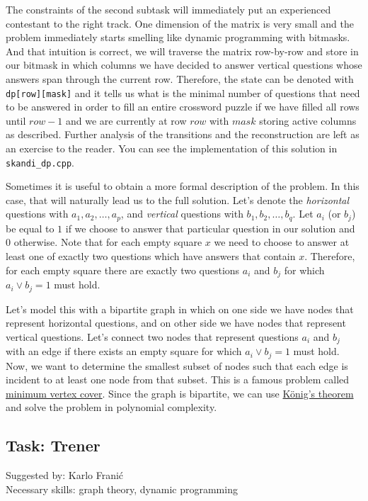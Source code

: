 \documentclass[a4paper]{article}
\begin{document}
The constraints of the second subtask will immediately put an experienced
contestant to the right track. One dimension of the matrix is very small and
the problem immediately starts smelling like dynamic programming with bitmasks.
And that intuition is correct, we will traverse the matrix row-by-row and store
in our bitmask in which columns we have decided to answer vertical questions
whose answers span through the current row. Therefore, the state can be denoted
with \texttt{dp[row][mask]} and it tells us what is the minimal number of
questions that need to be answered in order to fill an entire crossword puzzle
if we have filled all rows until $row-1$ and we are currently at row $row$ with
$mask$ storing active columns as described. Further analysis of the transitions
and the reconstruction are left as an exercise to the reader. You can see the
implementation of this solution in \texttt{skandi\_dp.cpp}.

Sometimes it is useful to obtain a more formal description of the problem.  In
this case, that will naturally lead us to the full solution. Let's denote the
\textit{horizontal} questions with $a_1, a_2, \dots, a_p$, and
\textit{vertical} questions with $b_1, b_2, \dots, b_q$. Let $a_i$ (or $b_j$)
be equal to $1$ if we choose to answer that particular question in our solution
and $0$ otherwise. Note that for each empty square $x$ we need to choose to
answer at least one of exactly two questions which have answers that contain
$x$. Therefore, for each empty square there are exactly two questions $a_i$
and $b_j$ for which $a_i \lor b_j = 1$ must hold.

Let's model this with a bipartite graph in which on one side we have nodes
that represent horizontal questions, and on other side we have nodes that
represent vertical questions. Let's connect two nodes that represent questions
$a_i$ and $b_j$ with an edge if there exists an empty square for which
$a_i \lor b_j = 1$ must hold. Now, we want to determine the smallest subset
of nodes such that each edge is incident to at least one node from that
subset. This is a famous problem called
\href{https://en.wikipedia.org/wiki/Vertex\_cover}{minimum vertex cover}.
Since the graph is bipartite, we can use
\href{https://en.wikipedia.org/wiki/K%C5%91nig%27s_theorem_(graph_theory)}{K\"{o}nig's
theorem} and solve the problem in polynomial complexity.

\clearpage

\subsection*{Task: Trener}
\textsf{Suggested by: Karlo Franić}\\
\textsf{Necessary skills: graph theory, dynamic programming}
\end{document}
